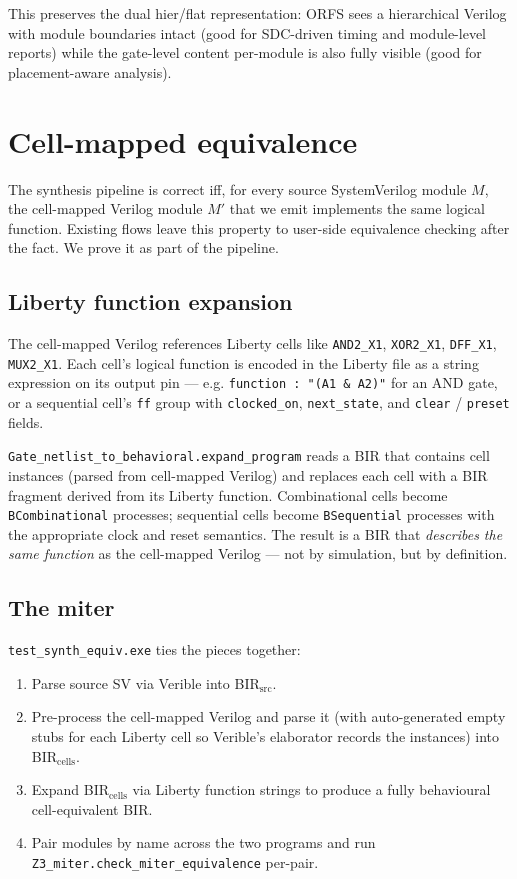 \documentclass[11pt,a4paper]{article}
\begin{document}
This preserves the dual hier/flat representation: ORFS sees a
hierarchical Verilog with module boundaries intact (good for
SDC-driven timing and module-level reports) while the gate-level
content per-module is also fully visible (good for placement-aware
analysis).

\section{Cell-mapped equivalence}
\label{sec:cell-equiv}

The synthesis pipeline is correct iff, for every source SystemVerilog
module $M$, the cell-mapped Verilog module $M'$ that we emit
implements the same logical function.  Existing flows leave this
property to user-side equivalence checking after the fact.  We
prove it as part of the pipeline.

\subsection{Liberty function expansion}

The cell-mapped Verilog references Liberty cells like
\texttt{AND2\_X1}, \texttt{XOR2\_X1}, \texttt{DFF\_X1},
\texttt{MUX2\_X1}.  Each cell's logical function is encoded in the
Liberty file as a string expression on its output pin --- e.g.
\texttt{function : "(A1 \& A2)"} for an AND gate, or a
sequential cell's \texttt{ff} group with \texttt{clocked\_on},
\texttt{next\_state}, and \texttt{clear} / \texttt{preset} fields.

\texttt{Gate\_netlist\_to\_behavioral.expand\_program} reads a BIR
that contains cell instances (parsed from cell-mapped Verilog) and
replaces each cell with a BIR fragment derived from its Liberty
function.  Combinational cells become \texttt{BCombinational}
processes; sequential cells become \texttt{BSequential} processes
with the appropriate clock and reset semantics.  The result is a
BIR that \emph{describes the same function} as the cell-mapped
Verilog --- not by simulation, but by definition.

\subsection{The miter}

\texttt{test\_synth\_equiv.exe} ties the pieces together:

\begin{enumerate}
\item Parse source SV via Verible into BIR$_{\textrm{src}}$.
\item Pre-process the cell-mapped Verilog and parse it (with
auto-generated empty stubs for each Liberty cell so Verible's
elaborator records the instances) into BIR$_{\textrm{cells}}$.
\item Expand BIR$_{\textrm{cells}}$ via Liberty function strings
to produce a fully behavioural cell-equivalent BIR.
\item Pair modules by name across the two programs and run
\texttt{Z3\_miter.check\_miter\_equivalence} per-pair.
\end{enumerate}
\end{document}

